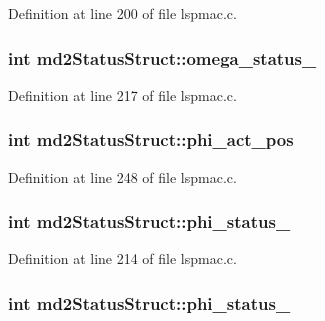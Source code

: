 Definition at line 200 of file lspmac.c.\hypertarget{structmd2StatusStruct_a8577c9df7b663b548b2759ac3db721cd}{
\subsubsection[{omega\_\-status\_\-2}]{\setlength{\rightskip}{0pt plus 5cm}int {\bf md2StatusStruct::omega\_\-status\_}}}
\label{structmd2StatusStruct_a8577c9df7b663b548b2759ac3db721cd}


Definition at line 217 of file lspmac.c.\hypertarget{structmd2StatusStruct_a4de22995a72ff6e72a1a9ccab6d00620}{
\subsubsection[{phi\_\-act\_\-pos}]{\setlength{\rightskip}{0pt plus 5cm}int {\bf md2StatusStruct::phi\_\-act\_\-pos}}}
\label{structmd2StatusStruct_a4de22995a72ff6e72a1a9ccab6d00620}


Definition at line 248 of file lspmac.c.\hypertarget{structmd2StatusStruct_ad8b8fd90ffff43016e2adaab5ccbfa02}{
\subsubsection[{phi\_\-status\_\-1}]{\setlength{\rightskip}{0pt plus 5cm}int {\bf md2StatusStruct::phi\_\-status\_}}}
\label{structmd2StatusStruct_ad8b8fd90ffff43016e2adaab5ccbfa02}


Definition at line 214 of file lspmac.c.\hypertarget{structmd2StatusStruct_a0e6cea4c32cb34e602b9ac3d21259219}{
\subsubsection[{phi\_\-status\_\-2}]{\setlength{\rightskip}{0pt plus 5cm}int {\bf md2StatusStruct::phi\_\-status\_}}}
\label{structmd2StatusStruct_a0e6cea4c32cb34e602b9ac3d21259219}


